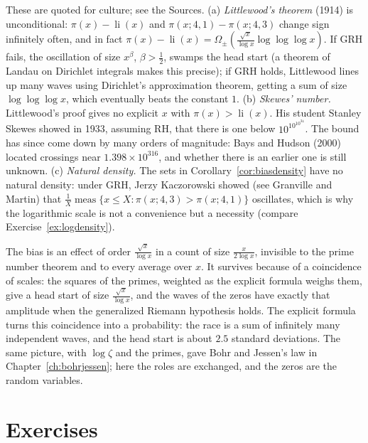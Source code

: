 \begin{remark}
These are quoted for culture; see the Sources. (a) \emph{Littlewood's theorem} (1914) is unconditional: $\pi(x)-\operatorname{li}(x)$ and $\pi(x;4,1)-\pi(x;4,3)$ change sign infinitely often, and in fact $\pi(x)-\operatorname{li}(x)=\Omega_\pm(\frac{\sqrt x}{\log x}\log\log\log x)$. If GRH fails, the oscillation of size $x^{\beta}$, $\beta>\frac12$, swamps the head start (a theorem of Landau on Dirichlet integrals makes this precise); if GRH holds, Littlewood lines up many waves using Dirichlet's approximation theorem, getting a sum of size $\log\log\log x$, which eventually beats the constant $1$. (b) \emph{Skewes' number.} Littlewood's proof gives no explicit $x$ with $\pi(x)>\operatorname{li}(x)$. His student Stanley Skewes showed in 1933, assuming RH, that there is one below $10^{10^{10^{34}}}$. The bound has since come down by many orders of magnitude: Bays and Hudson (2000) located crossings near $1.398\times10^{316}$, and whether there is an earlier one is still unknown. (c) \emph{Natural density.} The sets in Corollary~\ref{cor:biasdensity} have no natural density: under GRH, Jerzy Kaczorowski showed (see Granville and Martin) that $\frac1X\operatorname{meas}\{x\le X:\pi(x;4,3)>\pi(x;4,1)\}$ oscillates, which is why the logarithmic scale is not a convenience but a necessity (compare Exercise~\ref{ex:logdensity}).
\end{remark}

\begin{beauty}
The bias is an effect of order $\frac{\sqrt x}{\log x}$ in a count of size $\frac x{2\log x}$, invisible to the prime number theorem and to every average over $x$. It survives because of a coincidence of scales: the squares of the primes, weighted as the explicit formula weighs them, give a head start of size $\frac{\sqrt x}{\log x}$, and the waves of the zeros have exactly that amplitude when the generalized Riemann hypothesis holds. The explicit formula turns this coincidence into a probability: the race is a sum of infinitely many independent waves, and the head start is about $2.5$ standard deviations. The same picture, with $\log\zeta$ and the primes, gave Bohr and Jessen's law in Chapter~\ref{ch:bohrjessen}; here the roles are exchanged, and the zeros are the random variables.
\end{beauty}

\section{Exercises}

